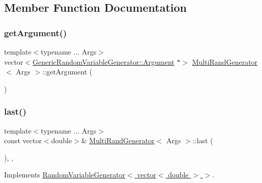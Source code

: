 \subsection{Member Function Documentation}
\hypertarget{class_multi_rand_generator_ab6309c317d42656c99fa0a81a019a48a}{}\label{class_multi_rand_generator_ab6309c317d42656c99fa0a81a019a48a} 
\subsubsection{\texorpdfstring{get\+Argument()}{getArgument()}}
{\footnotesize\ttfamily template$<$typename ... Args$>$ \\
vector$<$\hyperlink{class_generic_random_variable_generator_1_1_argument}{Generic\+Random\+Variable\+Generator\+::\+Argument} $\ast$$>$ \hyperlink{class_multi_rand_generator}{Multi\+Rand\+Generator}$<$ Args $>$\+::get\+Argument (\begin{DoxyParamCaption}{ }\end{DoxyParamCaption})\hspace{0.3cm}{\ttfamily [inline]}}

\hypertarget{class_multi_rand_generator_abb83dee0545ca24fab2999144de6f0e3}{}\label{class_multi_rand_generator_abb83dee0545ca24fab2999144de6f0e3} 
\subsubsection{\texorpdfstring{last()}{last()}}
{\footnotesize\ttfamily template$<$typename ... Args$>$ \\
const vector$<$double$>$\& \hyperlink{class_multi_rand_generator}{Multi\+Rand\+Generator}$<$ Args $>$\+::last (\begin{DoxyParamCaption}{ }\end{DoxyParamCaption})\hspace{0.3cm}{\ttfamily [inline]}, {\ttfamily [override]}, {\ttfamily [virtual]}}



Implements \hyperlink{class_random_variable_generator_aa84922aa58871845bc12116e05e6b5d4}{Random\+Variable\+Generator$<$ vector$<$ double $>$ $>$}.

\hypertarget{class_multi_rand_generator_a39838e440c70bb6de68052a2ea25e258}{}\label{class_multi_rand_generator_a39838e440c70bb6de68052a2ea25e258} 
